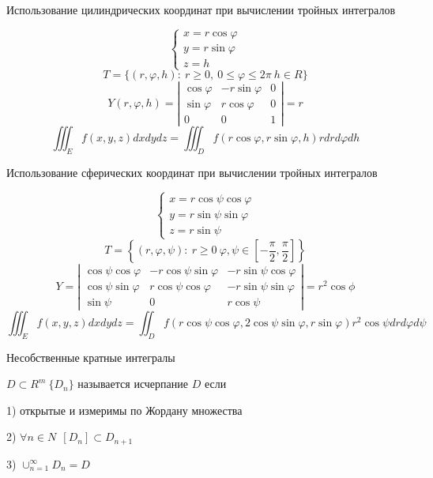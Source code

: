 \begin{title}[\Large]
  Использование цилиндрических координат при вычислении тройных интегралов
\end{title}
$$
\left\{
\begin{array}{c}
  x = r \cos \varphi \\
  y = r \sin \varphi \\
  z = h
\end{array}
\right.
$$
$$
T  = \{ (r, \varphi, h): ~ r \ge 0, ~ 0 \le \varphi \le 2\pi ~ h \in R \}
$$
$$
Y(r, \varphi, h) =
\left|
\begin{array}{ccc}
  \cos \varphi & -r \sin \varphi & 0 \\
  \sin \varphi & r \cos \varphi & 0 \\
  0 & 0 & 1
\end{array}
\right| = r
$$
$$
\iiint_E f(x, y, z) dxdydz = \iiint_D f(r\cos \varphi, r\sin \varphi, h) r
dr d\varphi dh
$$

\begin{title}[\Large]
  Использование сферических координат при вычислении тройных интегралов
\end{title}
$$
\left\{
\begin{array}{c}
  x = r \cos \psi \cos \varphi\\
  y = r \sin \psi \sin \varphi \\
  z = r \sin \psi
\end{array}
\right.
$$
$$
T = \left\{ (r, \varphi, \psi): ~ r \ge 0 ~ \varphi, \psi \in
\left[-\frac{\pi}{2}, \frac{\pi}{2}\right] \right\}
$$
$$
Y =
\left|
\begin{array}{ccc}
  \cos \psi \cos \varphi &
  -r \cos \psi \sin \varphi &
  -r \sin \psi \cos \varphi \\

  \cos \psi \sin \varphi &
  r \cos \psi \cos \varphi &
  -r \sin \psi \sin \varphi \\

  \sin \psi & 0 & r \cos \psi
\end{array}
\right| = r^2 \cos \phi
$$
$$
\iiint_E f(x,y,z) dxdydz = \iint_D f(r\cos \psi \cos \varphi,
2\cos \psi \sin \varphi, r\sin \varphi) r^2 \cos \psi dr d\varphi d\psi
$$

\begin{title}[\Large]
  Несобственные кратные интегралы
\end{title}

\begin{define}[исчерпания]
  $D \subset R^m ~ \{D_n\}$ называется исчерпание $D$ если

  1) открытые и измеримы по Жордану множества

  2) $\forall n \in N ~~ [D_n] \subset D_{n+1}$

  3) $\cup_{n=1}^{\infty} D_n = D$
\end{define}

